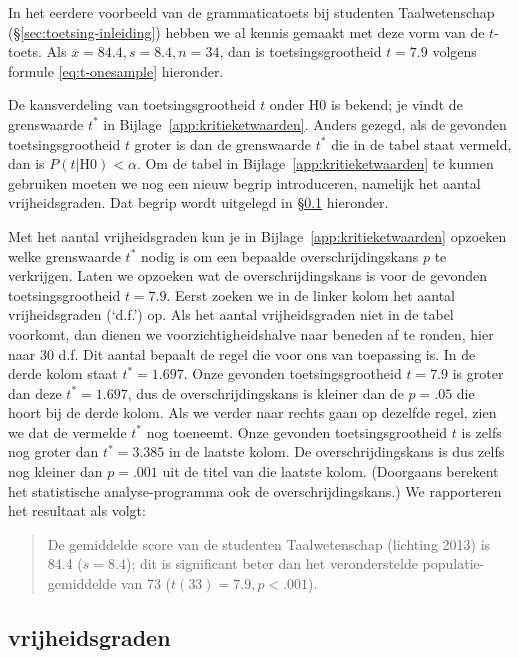 \documentclass[
]{book}
\begin{document}
In het eerdere voorbeeld van de grammaticatoets bij studenten
Taalwetenschap (§\ref{sec:toetsing-inleiding}) hebben we al kennis gemaakt met
deze vorm van de \(t\)-toets.
Als \(\overline{x}=84.4, s=8.4, n=34\), dan is
toetsingsgrootheid \(t=7.9\) volgens formule \eqref{eq:t-onesample} hieronder.

De kansverdeling van toetsingsgrootheid \(t\) onder H0 is bekend; je vindt
de grenswaarde \(t^*\) in
Bijlage~\ref{app:kritieketwaarden}. Anders gezegd, als de gevonden
toetsingsgrootheid \(t\) groter is dan de grenswaarde \(t^*\) die in de
tabel staat vermeld, dan is \(P(t|\textrm{H0})<\alpha\). Om de tabel in
Bijlage~\ref{app:kritieketwaarden} te kunnen gebruiken moeten we nog een
nieuw begrip introduceren, namelijk het aantal vrijheidsgraden. Dat
begrip wordt uitgelegd in
§\ref{sec:ttoets-vrijheidsgraden} hieronder.

Met het aantal vrijheidsgraden kun je in
Bijlage~\ref{app:kritieketwaarden} opzoeken welke grenswaarde \(t^*\) nodig
is om een bepaalde overschrijdingskans \(p\) te verkrijgen. Laten we
opzoeken wat de overschrijdingskans is voor de gevonden
toetsingsgrootheid \(t=7.9\). Eerst zoeken we in de linker kolom het
aantal vrijheidsgraden (`d.f.') op. Als het aantal vrijheidsgraden niet
in de tabel voorkomt, dan dienen we voorzichtigheidshalve naar beneden
af te ronden, hier naar 30 d.f. Dit aantal bepaalt de regel die voor ons
van toepassing is. In de derde kolom staat \(t^*=1.697\). Onze gevonden
toetsingsgrootheid \(t=7.9\) is groter dan deze \(t^*=1.697\), dus de
overschrijdingskans is kleiner dan de \(p=.05\) die hoort bij de derde
kolom. Als we verder naar rechts gaan op dezelfde regel, zien we dat de
vermelde \(t^*\) nog toeneemt. Onze gevonden toetsingsgrootheid \(t\) is
zelfs nog groter dan \(t^*=3.385\) in de laatste kolom. De
overschrijdingskans is dus zelfs nog kleiner dan \(p=.001\) uit de titel
van die laatste kolom. (Doorgaans berekent het statistische
analyse-programma ook de overschrijdingskans.) We rapporteren het
resultaat als volgt:

\begin{quote}
De gemiddelde score van de studenten Taalwetenschap (lichting 2013) is
84.4 (\(s=8.4\)); dit is significant beter dan het veronderstelde
populatie-gemiddelde van 73 (\(t(33)=7.9, p<.001\)).
\end{quote}

\hypertarget{sec:ttoets-vrijheidsgraden}{%
\subsection{vrijheidsgraden}\label{sec:ttoets-vrijheidsgraden}}
\end{document}
